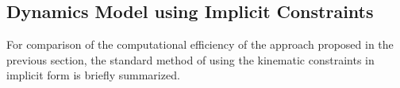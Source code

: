 \documentclass[letterpaper, 10 pt, conference]{ieeeconf}  %
\begin{document}
%


\subsection{Dynamics Model using Implicit Constraints}
\label{sec:DynamicsImpl}

For comparison of the computational efficiency of the approach proposed in the previous section, the standard method \cite{NakamuraGho1989,ParkChoPlo1999,KhalilBen1995,SaminFis2013} of using the kinematic constraints in implicit form is briefly summarized.
\end{document}
